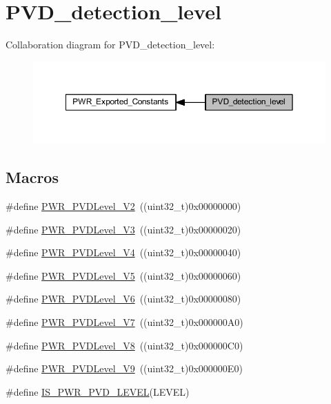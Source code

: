 \hypertarget{group___p_v_d__detection__level}{}\section{P\+V\+D\+\_\+detection\+\_\+level}
\label{group___p_v_d__detection__level}
Collaboration diagram for P\+V\+D\+\_\+detection\+\_\+level\+:
\nopagebreak
\begin{figure}[H]
\begin{center}
\leavevmode
\includegraphics[width=350pt]{group___p_v_d__detection__level}
\end{center}
\end{figure}
\subsection*{Macros}
\begin{DoxyCompactItemize}
\item 
\#define \hyperlink{group___p_v_d__detection__level_ga5cf8b09ed099c7412fcee6ccec2ec20b}{P\+W\+R\+\_\+\+P\+V\+D\+Level\+\_\+V2}~((uint32\+\_\+t)0x00000000)
\item 
\#define \hyperlink{group___p_v_d__detection__level_ga561e543dedb4c2cb126ec8d9d604260c}{P\+W\+R\+\_\+\+P\+V\+D\+Level\+\_\+V3}~((uint32\+\_\+t)0x00000020)
\item 
\#define \hyperlink{group___p_v_d__detection__level_ga5b585e7e6eda29e8b119e16779ba7a8b}{P\+W\+R\+\_\+\+P\+V\+D\+Level\+\_\+V4}~((uint32\+\_\+t)0x00000040)
\item 
\#define \hyperlink{group___p_v_d__detection__level_gad91e74c3034a5baccca70250815e680e}{P\+W\+R\+\_\+\+P\+V\+D\+Level\+\_\+V5}~((uint32\+\_\+t)0x00000060)
\item 
\#define \hyperlink{group___p_v_d__detection__level_ga46174e5288082b59473068a3ca8e8ea6}{P\+W\+R\+\_\+\+P\+V\+D\+Level\+\_\+V6}~((uint32\+\_\+t)0x00000080)
\item 
\#define \hyperlink{group___p_v_d__detection__level_ga72d22a858d8289ef02fff45f4810b916}{P\+W\+R\+\_\+\+P\+V\+D\+Level\+\_\+V7}~((uint32\+\_\+t)0x000000\+A0)
\item 
\#define \hyperlink{group___p_v_d__detection__level_ga5f38835a95c026b1db16dbebf81b45a2}{P\+W\+R\+\_\+\+P\+V\+D\+Level\+\_\+V8}~((uint32\+\_\+t)0x000000\+C0)
\item 
\#define \hyperlink{group___p_v_d__detection__level_ga9c156a7155f9946c0d3a73794f51a1ce}{P\+W\+R\+\_\+\+P\+V\+D\+Level\+\_\+V9}~((uint32\+\_\+t)0x000000\+E0)
\item 
\#define \hyperlink{group___p_v_d__detection__level_gabac4485a57abc97aad91eaa0b65ae927}{I\+S\+\_\+\+P\+W\+R\+\_\+\+P\+V\+D\+\_\+\+L\+E\+V\+EL}(L\+E\+V\+EL)
\end{DoxyCompactItemize}


